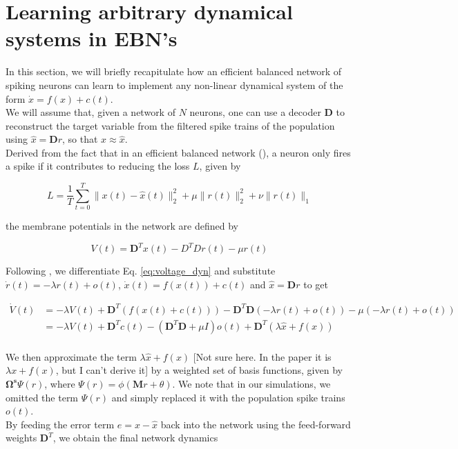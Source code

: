 \documentclass[twoside,11pt,titlepage]{article}
\begin{document}
\section{Learning arbitrary dynamical systems in EBN's} \label{sec:learning_rule}
In this section, we will briefly recapitulate how an efficient balanced network of spiking neurons can learn to implement any non-linear dynamical system of the form $\dot{x}=f(x)+c(t)$. \\
We will assume that, given a network of $N$ neurons, one can use a decoder $\mathbf{D}$ to reconstruct the target variable from the filtered spike trains of the population
using $\hat{x} = \mathbf{D}r$, so that $x \approx \hat{x}$. \\
Derived from the fact that in an efficient balanced network (\cite{Bourdoukan:2012:LOS:2999325.2999390}), a neuron only fires a spike if it contributes to reducing the loss $L$, given by

\begin{equation*}
  L = \frac{1}{T} \sum_{t=0}^T\|x(t)-\hat{x}(t)\|_2^2 + \mu\|r(t)\|_2^2 + \nu\|r(t)\|_1
\end{equation*}

the membrane potentials in the network are defined by

\begin{equation} \label{eq:voltage_dyn}
  V(t) = \mathbf{D}^Tx(t) - D^TDr(t) - \mu r(t)
\end{equation}

Following \cite{alemi2017learning}, we differentiate Eq. \ref{eq:voltage_dyn} and substitute $\dot{r}(t)=-\lambda r(t) + o(t)$, $\dot{x}(t)=f(x(t))+c(t)$ and $\hat{x}=\mathbf{D}r$ to get

\begin{equation*}
  \begin{split}
    \dot{V}(t) &= -\lambda V(t) + \mathbf{D}^T(f(x(t)+c(t))) - \mathbf{D}^T\mathbf{D}(-\lambda r(t)+o(t)) - \mu (-\lambda r(t) + o(t)) \\
    &= - \lambda V(t) + \mathbf{D}^T c(t) - (\mathbf{D}^T\mathbf{D}+\mu I)o(t) + \mathbf{D}^T(\lambda \hat{x} + f(x)) \\
  \end{split}
\end{equation*}

We then approximate the term $\lambda \hat{x} + f(x)$ [Not sure here. In the paper it is $\lambda x + f(x)$, but I can't derive it] by a weighted set of basis functions, given by $\mathbf{\Omega^s} \Psi(r)$, where $\Psi(r)=\phi(\mathbf{M}r+\theta)$. We note that
in our simulations, we omitted the term $\Psi(r)$ and simply replaced it with the population spike trains $o(t)$. \\
By feeding the error term $e = x - \hat{x}$ back into the network using the feed-forward weights $\mathbf{D}^T$, we obtain the final network dynamics
\end{document}
